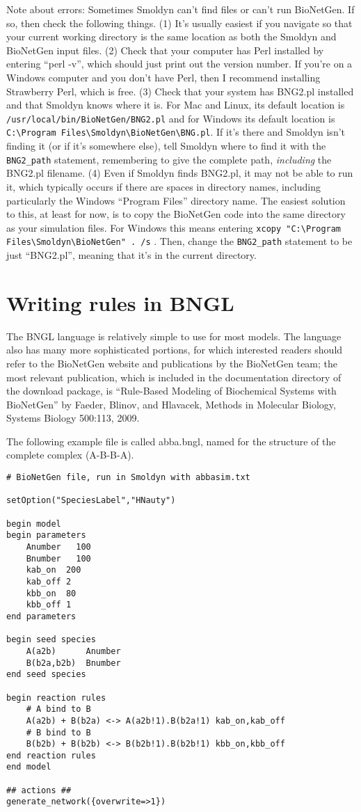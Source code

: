 \documentclass {scrbook}
\newcommand {\ttt} {\texttt}
\begin{document}
Note about errors: Sometimes Smoldyn can't find files or can't run BioNetGen. If so, then check the following things. (1) It's usually easiest if you navigate so that your current working directory is the same location as both the Smoldyn and BioNetGen input files. (2) Check that your computer has Perl installed by entering ``perl -v'', which should just print out the version number. If you're on a Windows computer and you don't have Perl, then I recommend installing Strawberry Perl, which is free. (3) Check that your system has BNG2.pl installed and that Smoldyn knows where it is. For Mac and Linux, its default location is \ttt{/usr/local/bin/BioNetGen/BNG2.pl} and for Windows its default location is \verb!C:\Program Files\Smoldyn\BioNetGen\BNG.pl!. If it's there and Smoldyn isn't finding it (or if it's somewhere else), tell Smoldyn where to find it with the \ttt{BNG2\_path} statement, remembering to give the complete path, \textit{including} the BNG2.pl filename. (4) Even if Smoldyn finds BNG2.pl, it may not be able to run it, which typically occurs if there are spaces in directory names, including particularly the Windows ``Program Files'' directory name. The easiest solution to this, at least for now, is to copy the BioNetGen code into the same directory as your simulation files. For Windows this means entering \verb!xcopy "C:\Program Files\Smoldyn\BioNetGen" . /s! . Then, change the \ttt{BNG2\_path} statement to be just ``BNG2.pl'', meaning that it's in the current directory.

\section{Writing rules in BNGL}

The BNGL language is relatively simple to use for most models. The language also has many more sophisticated portions, for which interested readers should refer to the BioNetGen website and publications by the BioNetGen team; the most relevant publication, which is included in the documentation directory of the download package, is ``Rule-Based Modeling of Biochemical Systems with BioNetGen'' by Faeder, Blinov, and Hlavacek, Methods in Molecular Biology, Systems Biology 500:113, 2009.

The following example file is called abba.bngl, named for the structure of the complete complex (A-B-B-A).

\begin{lstlisting}[style=SSAC]
# BioNetGen file, run in Smoldyn with abbasim.txt

setOption("SpeciesLabel","HNauty")

begin model
begin parameters
	Anumber   100
	Bnumber   100
	kab_on	200
	kab_off	2
	kbb_on	80
	kbb_off	1
end parameters

begin seed species
	A(a2b)		Anumber
	B(b2a,b2b)	Bnumber
end seed species

begin reaction rules
	# A bind to B
	A(a2b) + B(b2a) <-> A(a2b!1).B(b2a!1) kab_on,kab_off
	# B bind to B
	B(b2b) + B(b2b) <-> B(b2b!1).B(b2b!1) kbb_on,kbb_off
end reaction rules
end model

## actions ##
generate_network({overwrite=>1})
\end{lstlisting}
\end{document}
